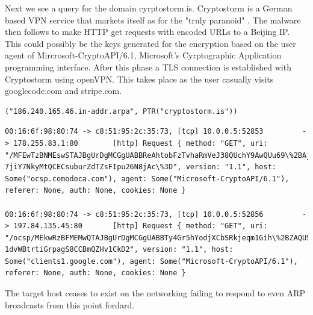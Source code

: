 \documentclass[11pt]{diazessay} %
\begin{document}
Next we see a query for the domain cyrptostorm.is. Cryptostorm is a German based VPN service that markets itself as for the "truly paranoid" \cite{cryptostorm}. The malware then follows to make HTTP get requests with encoded URLs to a Beijing IP. This could possibly be the keys generated for the encryption based on the user agent of Mircrosoft-CryptoAPI/6.1, Microsoft's Cyrptographic Application programming interface. After this phase a TLS connection is established with Cryptostorm using openVPN. This takes place as the user casually visits googlecode.com and stripe.com. 

\begin{lstlisting}
("186.240.165.46.in-addr.arpa", PTR("cryptostorm.is"))
\end{lstlisting}

\begin{lstlisting}
00:16:6f:98:80:74 -> c8:51:95:2c:35:73, [tcp] 10.0.0.5:52853         -> 178.255.83.1:80        [http] Request { method: "GET", uri: "/MFEwTzBNMEswSTAJBgUrDgMCGgUABBReAhtobFzTvhaRmVeJ38QUchY9AwQUu69\%2BAj36pvE8hI6t
7jiY7NkyMtQCECsuburZdTZsFIpu26N8jAc\%3D", version: "1.1", host: Some("ocsp.comodoca.com"), agent: Some("Microsoft-CryptoAPI/6.1"), referer: None, auth: None, cookies: None }

00:16:6f:98:80:74 -> c8:51:95:2c:35:73, [tcp] 10.0.0.5:52856         -> 197.84.135.45:80       [http] Request { method: "GET", uri: "/ocsp/MEkwRzBFMEMwQTAJBgUrDgMCGgUABBTy4Gr5hYodjXCbSRkjeqm1Gih\%2BZAQUSt0GFhu89mi
1dvWBtrtiGrpagS8CCBmQZHv1CkD2", version: "1.1", host: Some("clients1.google.com"), agent: Some("Microsoft-CryptoAPI/6.1"), referer: None, auth: None, cookies: None }
\end{lstlisting}


The target host ceases to exist on the networking failing to respond to even ARP broadcasts from this point fordard. 
\end{document}
